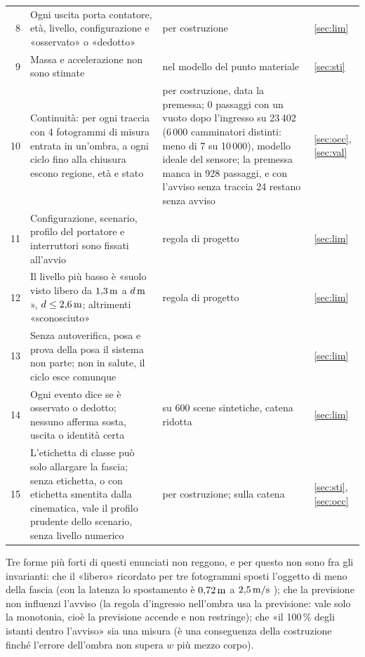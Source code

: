 \begin{table}[H]
\begin{tabularx}{\linewidth}{@{}rLLp{1.1cm}@{}}
8 & Ogni uscita porta contatore, età, livello, configurazione e «osservato» o «dedotto» & per costruzione & \ref{sec:lim}\\
9 & Massa e accelerazione non sono stimate &  nel modello del punto materiale & \ref{sec:sti}\\
10 & Continuità: per ogni traccia con 4 fotogrammi di misura entrata in un'ombra, a ogni ciclo fino alla chiusura escono regione, età e stato & per costruzione, data la premessa;  0 passaggi con un vuoto dopo l'ingresso su 23\,402 (6\,000 camminatori distinti: meno di 7 su 10\,000), modello ideale del sensore; la premessa manca in 928 passaggi, e con l'avviso senza traccia 24 restano senza avviso & \ref{sec:occ}, \ref{sec:val}\\
11 & Configurazione, scenario, profilo del portatore e interruttori sono fissati all'avvio & regola di progetto & \ref{sec:lim}\\
12 & Il livello più basso è «suolo visto libero da $1{,}3\,\mathrm{m}$ a $d\,\mathrm{m}$», $d\le2{,}6\,\mathrm{m}$; altrimenti «sconosciuto» & regola di progetto & \ref{sec:lim}\\
13 & Senza autoverifica, posa e prova della posa il sistema non parte; non in salute, il ciclo esce comunque &  & \ref{sec:lim}\\
14 & Ogni evento dice se è osservato o dedotto; nessuno afferma sosta, uscita o identità certa &  su 600 scene sintetiche, catena ridotta & \ref{sec:lim}\\
15 & L'etichetta di classe può solo allargare la fascia; senza etichetta, o con etichetta smentita dalla cinematica, vale il profilo prudente dello scenario, senza livello numerico & per costruzione;  sulla catena & \ref{sec:sti}, \ref{sec:occ}\\
\bottomrule
\end{tabularx}
\end{table}

Tre forme più forti di questi enunciati non reggono, e per questo non sono fra gli invarianti: che il «libero» ricordato per tre fotogrammi sposti l'oggetto di meno della fascia (con la latenza lo spostamento è $0{,}72\,\mathrm{m}$ a $2{,}5\,\mathrm{m/s}$ ); che la previsione non influenzi l'avviso (la regola d'ingresso nell'ombra usa la previsione: vale solo la monotonia, cioè la previsione accende e non restringe); che «il 100\,\% degli istanti dentro l'avviso» sia una misura (è una conseguenza della costruzione finché l'errore dell'ombra non supera $w$ più mezzo corpo).

